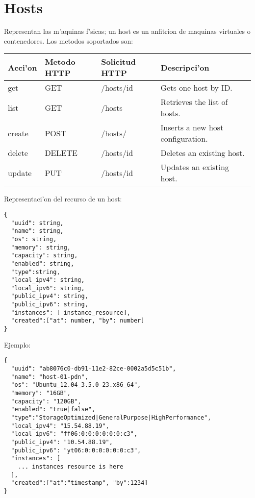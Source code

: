 \section{Hosts}
Representan las m'aquinas f'sicas; un host es un anfitrion de maquinas virtuales o contenedores. Los metodos soportados son:

\begin{center}
 \begin{tabular}{| l | l | l | l |}
 \hline
  \rowcolor{blueapi}
  \textbf{Acci'on} & \textbf{Metodo HTTP} & \textbf{Solicitud HTTP} & \textbf{Descripci'on} \\ [0.5ex] 
  \hline\hline
  get & GET & /hosts/id & Gets one host by ID. \\
  \hline
  list & GET & /hosts & Retrieves the list of hosts. \\
  \hline  
  create & POST & /hosts/ & Inserts a new host configuration. \\
  \hline
  delete & DELETE & /hosts/id & Deletes an existing host. \\
  \hline  
  update & PUT & /hosts/id & Updates an existing host. \\ [1ex] 
  \hline
\end{tabular}
\end{center}

Representaci'on del recurso de un host:

\medskip
\begin{lstlisting}[style=json]
{
  "uuid": string,
  "name": string,
  "os": string,
  "memory": string,
  "capacity": string,
  "enabled": string,
  "type":string,
  "local_ipv4": string,
  "local_ipv6": string,
  "public_ipv4": string,
  "public_ipv6": string,
  "instances": [ instance_resource],
  "created":["at": number, "by": number]
}
\end{lstlisting}

Ejemplo:

\medskip
\begin{lstlisting}[style=json]
{
  "uuid": "ab8076c0-db91-11e2-82ce-0002a5d5c51b",
  "name": "host-01-pdn",
  "os": "Ubuntu_12.04_3.5.0-23.x86_64",
  "memory": "16GB",
  "capacity": "120GB",
  "enabled": "true|false",
  "type":"StorageOptimized|GeneralPurpose|HighPerformance",
  "local_ipv4": "15.54.88.19",
  "local_ipv6": "ff06:0:0:0:0:0:0:c3",
  "public_ipv4": "10.54.88.19",
  "public_ipv6": "yt06:0:0:0:0:0:0:c3",
  "instances": [
    ... instances resource is here
  ],
  "created":["at":"timestamp", "by":1234]
}
\end{lstlisting}

